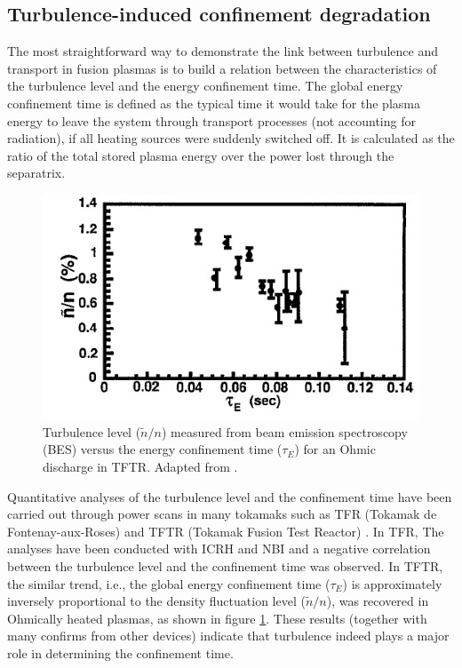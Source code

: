 \subsection{Turbulence-induced confinement degradation} \label{sec:turbulence_degrades_confinement}

The most straightforward way to demonstrate the link between turbulence and transport in fusion plasmas is to build a relation between the characteristics of the turbulence level and the energy confinement time. The global energy confinement time is defined as the typical time it would take for the plasma energy to leave the system through transport processes (not accounting for radiation), if all heating sources were suddenly switched off. It is calculated as the ratio of the total stored plasma energy over the power lost through the separatrix.

\begin{figure}[h]
\begin{centering}
\includegraphics[scale=0.65]{tau_vs_dn.png}
\par\end{centering}
\caption{Turbulence level ($\widetilde{n}/n$) measured from beam emission spectroscopy (BES) versus the energy confinement time ($\tau_E$) for an Ohmic discharge in TFTR. Adapted from \cite{Paul_1992_PoF}.}
\label{fig:tau_vs_dn}
\end{figure}

Quantitative analyses of the turbulence level and the confinement time have been carried out through power scans in many tokamaks such as TFR (Tokamak de Fontenay-aux-Roses) \cite{TFR_1986_NF} and TFTR (Tokamak Fusion Test Reactor) \cite{Paul_1992_PoF}. In TFR, The analyses have been conducted with ICRH and NBI and a negative correlation between the turbulence level and the confinement time was observed. In TFTR, the similar trend, i.e., the global energy confinement time ($\tau_E$) is approximately inversely proportional to the density fluctuation level ($\widetilde{n}/n$), was recovered in Ohmically heated plasmas, as shown in figure \ref{fig:tau_vs_dn}. These results (together with many confirms from other devices) indicate that turbulence indeed plays a major role in determining the confinement time.


